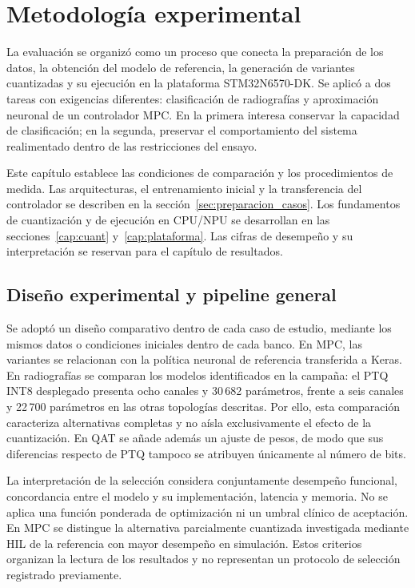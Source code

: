 \chapter{Metodología experimental}
\label{cap:metodologia}\label{cap:metodologia_general}

La evaluación se organizó como un proceso que conecta la preparación de los datos, la obtención del modelo de referencia, la generación de variantes cuantizadas y su ejecución en la plataforma STM32N6570-DK. Se aplicó a dos tareas con exigencias diferentes: clasificación de radiografías y aproximación neuronal de un controlador MPC. En la primera interesa conservar la capacidad de clasificación; en la segunda, preservar el comportamiento del sistema realimentado dentro de las restricciones del ensayo.

Este capítulo establece las condiciones de comparación y los procedimientos de medida. Las arquitecturas, el entrenamiento inicial y la transferencia del controlador se describen en la sección~\ref{sec:preparacion_casos}. Los fundamentos de cuantización y de ejecución en CPU/NPU se desarrollan en las secciones~\ref{cap:cuant} y~\ref{cap:plataforma}. Las cifras de desempeño y su interpretación se reservan para el capítulo de resultados.

\section{Diseño experimental y pipeline general}
\label{sec:diseno_experimental}

Se adoptó un diseño comparativo dentro de cada caso de estudio, mediante los mismos datos o condiciones iniciales dentro de cada banco. En MPC, las variantes se relacionan con la política neuronal de referencia transferida a Keras. En radiografías se comparan los modelos identificados en la campaña: el PTQ INT8 desplegado presenta ocho canales y 30\,682 parámetros, frente a seis canales y 22\,700 parámetros en las otras topologías descritas. Por ello, esta comparación caracteriza alternativas completas y no aísla exclusivamente el efecto de la cuantización. En QAT se añade además un ajuste de pesos, de modo que sus diferencias respecto de PTQ tampoco se atribuyen únicamente al número de bits.

La interpretación de la selección considera conjuntamente desempeño funcional, concordancia entre el modelo y su implementación, latencia y memoria. No se aplica una función ponderada de optimización ni un umbral clínico de aceptación. En MPC se distingue la alternativa parcialmente cuantizada investigada mediante HIL de la referencia con mayor desempeño en simulación. Estos criterios organizan la lectura de los resultados y no representan un protocolo de selección registrado previamente.

